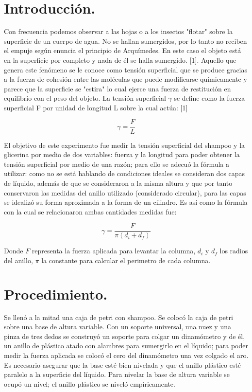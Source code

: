 \documentclass[a4paper]{article}
\begin{document}
\section*{Introducción.}
Con frecuencia podemos observar a las hojas o a los insectos "flotar" sobre la superficie de un cuerpo de agua. No se hallan sumergidos, por lo tanto no reciben el empuje según enuncia el principio de Arquímedes. En este caso el objeto está en la superficie por completo y nada de él se halla sumergido. [1]. Aquello que genera este fenómeno se le conoce como tensión superficial que se produce gracias a la fuerza de cohesión entre las moléculas que puede modificarse químicamente y parece que la superficie se "estira" lo cual  ejerce una fuerza de restitución en equilibrio con el peso del objeto. La tensión superficial $\gamma$ se define como la fuerza superficial
F por unidad de longitud L sobre la cual actúa: [1]

\begin{equation}
    \gamma = \frac{F}{L}
\end{equation}

El objetivo de este experimento fue medir la tensión superficial del shampoo y la glicerina por medio de dos variables: fuerza y la longitud para poder obtener la tensión superficial por medio de una razón; para ello se adecuó la fórmula a utilizar: como no se está hablando de condiciones ideales se consideran dos capas de líquido, además de que se consideraron a la misma altura y que por tanto conservaron las medidas del anillo utilizado (considerado circular), para las capas se idealizó su forma aproximada a la forma de un cilindro. Es así como la fórmula con la cual se relacionaron ambas cantidades medidas fue:

\begin{equation}
    \gamma = \frac{F}{\pi (d_i + d_f)}
\end{equation}

Donde $F$ representa la fuerza aplicada para levantar la columna, $d_i$ y $d_f$ los radios del anillo, $\pi$ la constante para calcular el perimetro de cada columna.

\section*{Procedimiento.}
Se llenó a la mitad una caja de petri con shampoo. Se colocó la caja de petri sobre una base de altura variable. Con  un soporte universal, una nuez y una pinza de tres dedos se construyó un soporte para colgar un dinamómetro y de él, un anillo de plástico atado con alambres para sumergirlo en el líquido; para poder medir la fuerza aplicada se colocó el cero del dinamómetro una vez colgado el aro. Es necesario asegurar que la base esté bien nivelada y que el anillo plástico esté paralelo a la superficie del líquido. Para nivelar la base de altura variable se ocupó un nivel; el anillo plástico se niveló empíricamente.
\end{document}
